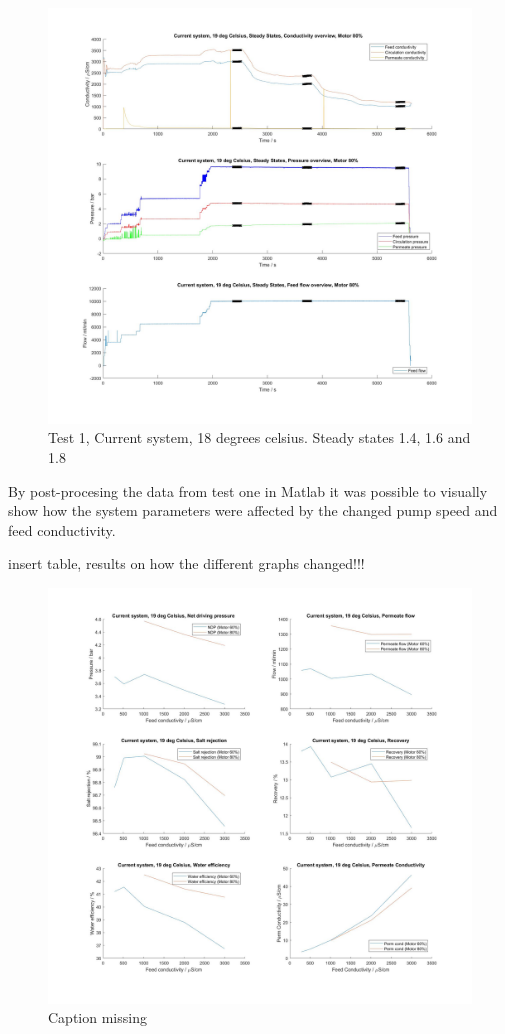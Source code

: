 \begin{figure}[H]
    \centering
    \includegraphics[width=1.1\textwidth]{overview20_80}
    \caption{Test 1, Current system, 18 degrees celsius. Steady states 1.4, 1.6 and 1.8}
    \label{fig:PressConn}
\end{figure}

\newpage

By post-procesing the data from test one in Matlab it was possible to visually show how the system parameters were affected by the changed pump speed and feed conductivity. 


insert table, results on how the different graphs changed!!!

\begin{figure}[H]
    \centering
    \includegraphics[width=1.1\textwidth]{Key20}
    \caption{Caption missing}
    \label{fig:PressConn}
\end{figure}

